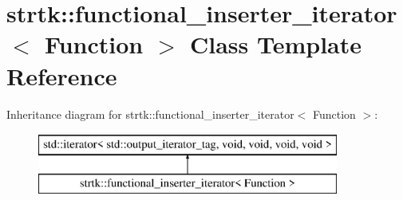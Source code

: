 \hypertarget{classstrtk_1_1functional__inserter__iterator}{\section{strtk\-:\-:functional\-\_\-inserter\-\_\-iterator$<$ Function $>$ Class Template Reference}
\label{classstrtk_1_1functional__inserter__iterator}
}
Inheritance diagram for strtk\-:\-:functional\-\_\-inserter\-\_\-iterator$<$ Function $>$\-:\begin{figure}[H]
\begin{center}
\leavevmode
\includegraphics[height=2.000000cm]{classstrtk_1_1functional__inserter__iterator}
\end{center}
\end{figure}
